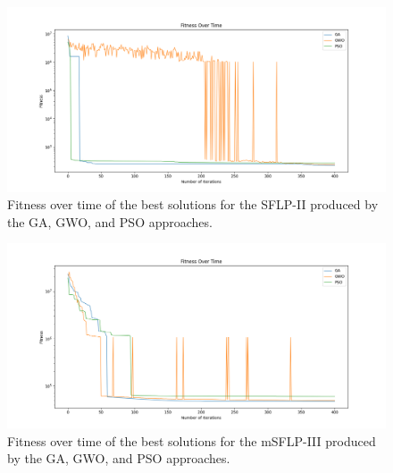 \begin{figure}[h!]
\centering
\begin{adjustwidth}{-0.45in}{}
\includegraphics[scale=0.5]{./images/chap07-rd/best-fitness-over-time-sflp2.png}
\end{adjustwidth}
\caption{Fitness over time of the best solutions for the SFLP-II produced by the GA, GWO, and PSO approaches.}
\label{graph-approaches-best-solutions-sflp-ii}
\end{figure}

\begin{figure}[h!]
\centering
\begin{adjustwidth}{-0.45in}{}
\includegraphics[scale=0.5]{./images/chap07-rd/best-fitness-over-time-msflp3.png}
\end{adjustwidth}
\caption{Fitness over time of the best solutions for the mSFLP-III produced by the GA, GWO, and PSO approaches.}
\label{graph-approaches-best-solutions-msflp-iii}
\end{figure}

